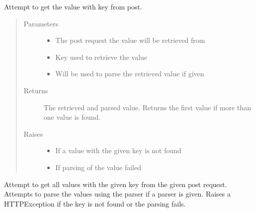 \documentclass[letterpaper,10pt,english]{sphinxmanual}
\begin{document}
\begin{fulllineitems}
\label{\detokenize{src:src.utils.try_get}}
Attempt to get the value with key from post.
\begin{quote}\begin{description}
\item[{Parameters}] \leavevmode\begin{itemize}
\item {} 
 \textendash{} The post request the value will be retrieved from

\item {} 
 \textendash{} Key used to retrieve the value

\item {} 
 \textendash{} Will be used to parse the retrieved value if given

\end{itemize}

\item[{Returns}] \leavevmode
The retrieved and parsed value.
Returns the first value if more than one value is found.

\item[{Raises}] \leavevmode\begin{itemize}
\item {} 
 \textendash{} If a value with the given key is not found

\item {} 
 \textendash{} If parsing of the value failed

\end{itemize}

\end{description}\end{quote}

\end{fulllineitems}


\begin{fulllineitems}
\label{\detokenize{src:src.utils.try_get_all}}
Attempt to get all values with the given key from the given post request.
Attempts to parse the values using the parser if a parser is given.
Raises a HTTPException if the key is not found or the parsing fails.

\end{fulllineitems}
\end{document}
